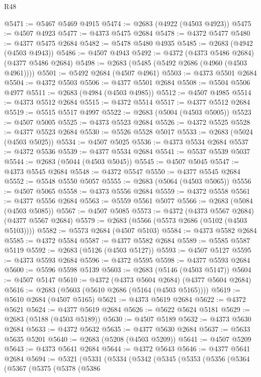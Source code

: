 \begin{lexlean}{R48}
\begin{coremodule}
@5471 := @5467 @5469 @4915
@5474 := @2683 (@4922 (@4503 @4923))
@5475 := @4507 @4923
@5477 := @4373 @5475 @2684
@5478 := @4372 @5477
@5480 := @4377 @5475 @2684
@5482 := @5478 @5480 @4935
@5485 := @2683 (@4942 (@4503 @4943))
@5486 := @4507 @4943
@5492 := @4372 (@4373 @5486 @2684) (@4377 @5486 @2684)
@5498 := @2683 (@5485 (@5492 @2686 (@4960 (@4503 @4961))))
@5501 := @5492 @2684 (@4507 @4961)
@5503 := @4373 @5501 @2684
@5504 := @4372 @5503
@5506 := @4377 @5501 @2684
@5508 := @5504 @5506 @4977
@5511 := @2683 (@4984 (@4503 @4985))
@5512 := @4507 @4985
@5514 := @4373 @5512 @2684
@5515 := @4372 @5514
@5517 := @4377 @5512 @2684
@5519 := @5515 @5517 @4997
@5522 := @2683 (@5004 (@4503 @5005))
@5523 := @4507 @5005
@5525 := @4373 @5523 @2684
@5526 := @4372 @5525
@5528 := @4377 @5523 @2684
@5530 := @5526 @5528 @5017
@5533 := @2683 (@5024 (@4503 @5025))
@5534 := @4507 @5025
@5536 := @4373 @5534 @2684
@5537 := @4372 @5536
@5539 := @4377 @5534 @2684
@5541 := @5537 @5539 @5037
@5544 := @2683 (@5044 (@4503 @5045))
@5545 := @4507 @5045
@5547 := @4373 @5545 @2684
@5548 := @4372 @5547
@5550 := @4377 @5545 @2684
@5552 := @5548 @5550 @5057
@5555 := @2683 (@5064 (@4503 @5065))
@5556 := @4507 @5065
@5558 := @4373 @5556 @2684
@5559 := @4372 @5558
@5561 := @4377 @5556 @2684
@5563 := @5559 @5561 @5077
@5566 := @2683 (@5084 (@4503 @5085))
@5567 := @4507 @5085
@5573 := @4372 (@4373 @5567 @2684) (@4377 @5567 @2684)
@5579 := @2683 (@5566 (@5573 @2686 (@5102 (@4503 @5103))))
@5582 := @5573 @2684 (@4507 @5103)
@5584 := @4373 @5582 @2684
@5585 := @4372 @5584
@5587 := @4377 @5582 @2684
@5589 := @5585 @5587 @5119
@5592 := @2683 (@5126 (@4503 @5127))
@5593 := @4507 @5127
@5595 := @4373 @5593 @2684
@5596 := @4372 @5595
@5598 := @4377 @5593 @2684
@5600 := @5596 @5598 @5139
@5603 := @2683 (@5146 (@4503 @5147))
@5604 := @4507 @5147
@5610 := @4372 (@4373 @5604 @2684) (@4377 @5604 @2684)
@5616 := @2683 (@5603 (@5610 @2686 (@5164 (@4503 @5165))))
@5619 := @5610 @2684 (@4507 @5165)
@5621 := @4373 @5619 @2684
@5622 := @4372 @5621
@5624 := @4377 @5619 @2684
@5626 := @5622 @5624 @5181
@5629 := @2683 (@5188 (@4503 @5189))
@5630 := @4507 @5189
@5632 := @4373 @5630 @2684
@5633 := @4372 @5632
@5635 := @4377 @5630 @2684
@5637 := @5633 @5635 @5201
@5640 := @2683 (@5208 (@4503 @5209))
@5641 := @4507 @5209
@5643 := @4373 @5641 @2684
@5644 := @4372 @5643
@5646 := @4377 @5641 @2684
@5694 := @5321
    (@5331
      (@5334
        (@5342
          (@5345
            (@5353
              (@5356
                (@5364
                  (@5367
                    (@5375
                      (@5378
                        (@5386

\end{coremodule}
\end{lexlean}
